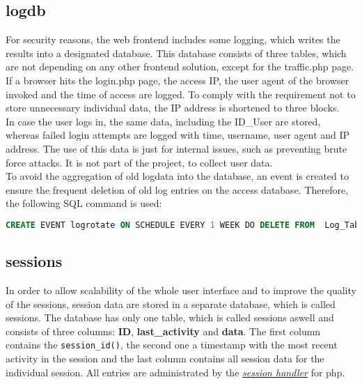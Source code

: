 \subsection{logdb}
For security reasons, the web frontend includes some logging, which writes the results into a designated database. This database consists of three tables, which are not depending 
on any other frontend solution, except for the traffic.php page. If a browser hits the login.php page, the access IP, the user agent of the browser invoked and the time of access 
are logged. To comply with the requirement not to store unnecessary individual data, the IP address is shortened to three blocks.\\
In case the user logs in, the same data, including the ID\_User are stored, whereas failed login attempts are logged with time, username, user agent and IP address. The use of 
this data is just for internal issues, such as preventing brute force attacks. It is not part of the project, to collect user data.\\
To avoid the aggregation of old logdata into the database, an event is created to ensure the frequent deletion of old log entries on the access database. Therefore, the 
following SQL command is used:
\begin{lstlisting}[language=sql]
CREATE EVENT logrotate ON SCHEDULE EVERY 1 WEEK DO DELETE FROM  Log_Table WHERE time < NOW() - 60*60*24*7;
\end{lstlisting}

\subsection{sessions}\label{sessions_database}
In order to allow scalability of the whole user interface and to improve the quality of the sessions, session data are stored in a separate database, which is called sessions. 
The database has only one table, which is called sessions aswell and consists of three columns: \textbf{ID}, \textbf{last\_activity} and \textbf{data}. The first column contains the 
\texttt{session\_id()}, the second one a timestamp with the most recent activity in the session and the last column contains all session data for the individual session. 
All entries are administrated by the \hyperref[session-handler]{\textit{session handler}} for php.
